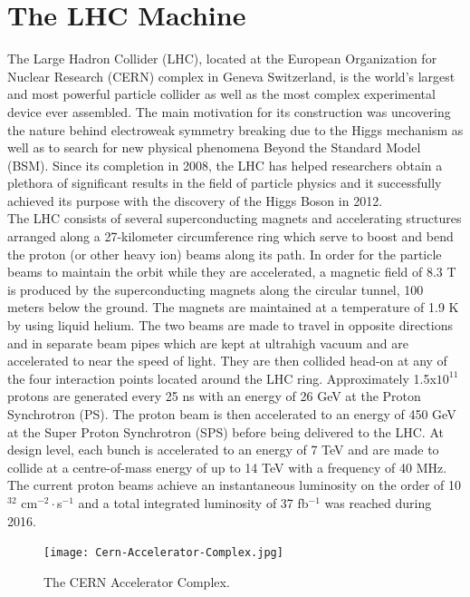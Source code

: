 \section{The LHC Machine}

The Large Hadron Collider (LHC)\cite{LHC}, located at the European Organization for Nuclear Research (CERN) complex in Geneva Switzerland, is the world's largest and most powerful particle collider as well as the most complex experimental device ever assembled. The main motivation for its construction was uncovering the nature behind electroweak symmetry breaking due to the Higgs mechanism as well as to search for new physical phenomena Beyond the Standard Model (BSM)\cite{BSM}. Since its completion in 2008, the LHC has helped researchers obtain a plethora of significant results in the field of particle physics and it successfully achieved its purpose with the discovery of the Higgs Boson in 2012.\\

The LHC consists of several superconducting magnets and accelerating structures arranged along a 27-kilometer circumference ring which serve to boost and bend the proton (or other heavy ion) beams along its path. In order for the particle beams to maintain the orbit while they are accelerated, a magnetic field of 8.3 T is produced by the superconducting magnets along the circular tunnel, 100 meters below the ground. The magnets are maintained at a temperature of 1.9 K by using liquid helium. The two beams are made to travel in opposite directions and in separate beam pipes which are kept at ultrahigh vacuum and are accelerated to near the speed of light. They are then collided head-on at any of the four interaction points located around the LHC ring. Approximately 1.5x$10^{11}$ protons are generated every 25 ns with an energy of 26 GeV at the Proton Synchrotron (PS). The proton beam is then accelerated to an energy of 450 GeV at the Super Proton Synchrotron (SPS)\cite{SPS} before being delivered to the LHC. At design level, each bunch is accelerated to an energy of 7 TeV and are made to collide at a centre-of-mass energy of up to 14 TeV with a frequency of 40 MHz.  The current proton beams achieve an instantaneous luminosity on the order of 10$^{32}$ cm$^{-2}\cdot$s${^{-1}}$ and a total integrated luminosity of 37 fb$^{-1}$ was reached during 2016\cite{CMSLHC}.\\

\begin{figure}[tb]
\begin{center}
\texttt{[image: Cern-Accelerator-Complex.jpg]} 
\caption{The CERN Accelerator Complex\cite{LHCcomplex}.}
\label{Cern-Accelerator-Complex.jpg} 
\hspace{4em}
\end{center}
\end{figure}

